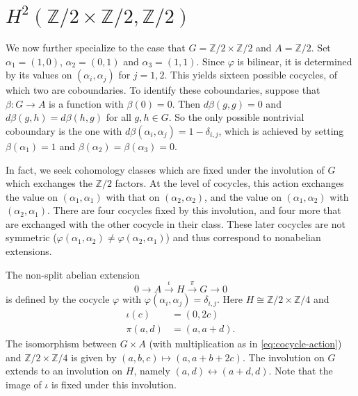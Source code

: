 \documentclass{article}
\newcommand{\ZZ}{\mathbb{Z}}
\newcommand{\Zt}{\ZZ/2}
\newcommand{\Zf}{\ZZ/4}
\theoremstyle{plain}
\begin{document}
\section*{$H^2(\Zt \times \Zt, \Zt)$}

We now further specialize to the case that $G = \Zt \times \Zt$ and $A = \Zt$.  Set $\alpha_1 = (1,0)$, $\alpha_2 = (0,1)$ and $\alpha_3 = (1,1)$.  Since $\varphi$ is bilinear, it is determined by its values on $(\alpha_i, \alpha_j)$ for $j = 1,2$.  This yields sixteen possible cocycles, of which two are coboundaries.  To identify these coboundaries, suppose that $\beta : G \to A$ is a function with $\beta(0) = 0$.  Then $d\beta(g,g) = 0$ and $d\beta(g,h) = d\beta(h,g)$ for all $g, h \in G$.  So the only possible nontrivial coboundary is the one with $d\beta(\alpha_i, \alpha_j) = 1 - \delta_{i,j}$, which is achieved by setting $\beta(\alpha_1) = 1$ and $\beta(\alpha_2) = \beta(\alpha_3) = 0$.

In fact, we seek cohomology classes which are fixed under the involution of $G$ which exchanges the $\Zt$ factors.  At the level of cocycles, this action exchanges the value on $(\alpha_1, \alpha_1)$ with that on $(\alpha_2, \alpha_2)$, and the value on $(\alpha_1, \alpha_2)$ with $(\alpha_2, \alpha_1)$.  There are four cocycles fixed by this involution, and four more that are exchanged with the other cocycle in their class.  These later cocycles are not symmetric ($\varphi(\alpha_1, \alpha_2) \ne \varphi(\alpha_2, \alpha_1)$) and thus correspond to nonabelian extensions.

The non-split abelian extension
\[
0 \to A \xrightarrow{\iota} H \xrightarrow{\pi} G \to 0
\]
is defined by the cocycle $\varphi$ with $\varphi(\alpha_i, \alpha_j) = \delta_{i,j}$.
Here $H \cong \Zt \times \Zf$ and
\begin{align*}
\iota(c) &= (0,2c) \\
\pi(a, d) &= (a, a+d).
\end{align*}
The isomorphism between $G \times A$ (with multiplication as in \eqref{eq:cocycle-action}) and $\Zt \times \Zf$ is given by $(a,b,c) \mapsto (a, a + b + 2c)$.  The involution on $G$ extends to an involution on $H$, namely $(a,d) \leftrightarrow (a+d,d)$.  Note that the image of $\iota$ is fixed under this involution.
\end{document}
